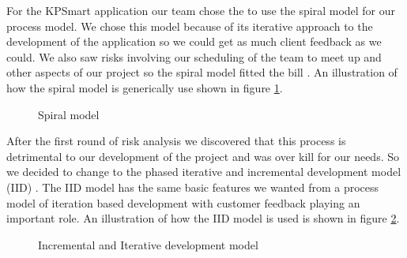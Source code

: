\documentclass{style/CRPITStyle}
\renewcommand{\cite}{\citep}
\begin{document}

For the KPSmart application our team chose the to use the spiral model for our
process model. We chose this model because of its iterative approach to the
development of the application so we could get as much client feedback as we
could. We also saw risks involving our scheduling of the team to meet up and other aspects
of our project so the spiral model fitted the bill \cite{boehm:1988:spiral}. 
An illustration of how the spiral model is generically use shown in figure
\ref{spiral-model}.

\vspace{.1in}

\begin{figure}[htb]
\caption{\protect\label{spiral-model} Spiral model }
\end{figure}

\vspace{.1in}

After the first round of risk analysis we discovered that this process is
detrimental to our development of the project and was over kill for our
needs. So we decided to change to the phased iterative and incremental
development model (IID) \cite{larman:2003:iid}. The IID model has the same basic features we wanted
from a process model of iteration based development with customer feedback
playing an important role. An illustration of how the IID model is used is shown
in figure \ref{iid-model}.

\vspace{.1in}

\begin{figure}[htb]
\caption{\protect\label{iid-model} Incremental and Iterative development model }
\end{figure}
\end{document}
